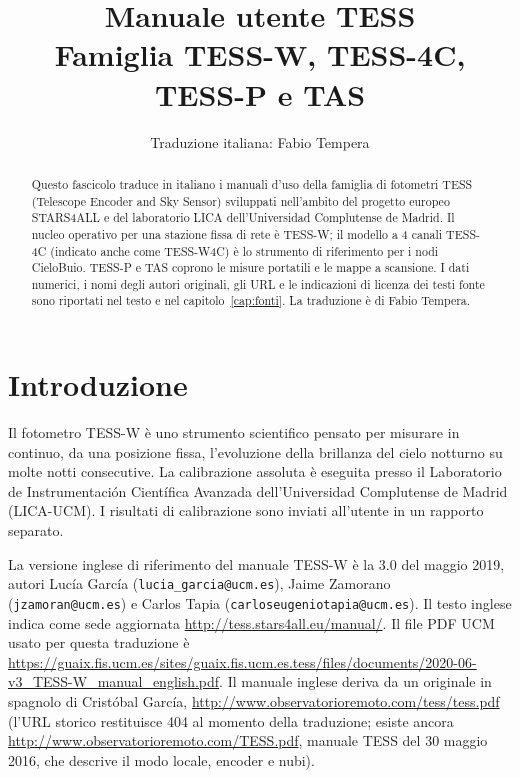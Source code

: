 \documentclass[11pt,a4paper]{report}
\title{Manuale utente TESS\\[0.6em]
\large Famiglia TESS-W, TESS-4C, TESS-P e TAS}
\author{Traduzione italiana: Fabio Tempera}
\date{}
\begin{document}
\maketitle

\begin{abstract}
Questo fascicolo traduce in italiano i manuali d'uso della famiglia di fotometri TESS (Telescope Encoder and Sky Sensor) sviluppati nell'ambito del progetto europeo STARS4ALL e del laboratorio LICA dell'Universidad Complutense de Madrid. Il nucleo operativo per una stazione fissa di rete è TESS-W; il modello a 4 canali TESS-4C (indicato anche come TESS-W4C) è lo strumento di riferimento per i nodi CieloBuio. TESS-P e TAS coprono le misure portatili e le mappe a scansione. I dati numerici, i nomi degli autori originali, gli URL e le indicazioni di licenza dei testi fonte sono riportati nel testo e nel capitolo~\ref{cap:fonti}. La traduzione è di Fabio Tempera.
\end{abstract}

\tableofcontents

\chapter{Introduzione}

Il fotometro TESS-W è uno strumento scientifico pensato per misurare in continuo, da una posizione fissa, l'evoluzione della brillanza del cielo notturno su molte notti consecutive. La calibrazione assoluta è eseguita presso il Laboratorio de Instrumentación Científica Avanzada dell'Universidad Complutense de Madrid (LICA-UCM). I risultati di calibrazione sono inviati all'utente in un rapporto separato.

La versione inglese di riferimento del manuale TESS-W è la 3.0 del maggio 2019, autori Lucía García (\texttt{lucia\_garcia@ucm.es}), Jaime Zamorano (\texttt{jzamoran@ucm.es}) e Carlos Tapia (\texttt{carloseugeniotapia@ucm.es}). Il testo inglese indica come sede aggiornata \url{http://tess.stars4all.eu/manual/}. Il file PDF UCM usato per questa traduzione è \url{https://guaix.fis.ucm.es/sites/guaix.fis.ucm.es.tess/files/documents/2020-06-v3_TESS-W_manual_english.pdf}. Il manuale inglese deriva da un originale in spagnolo di Cristóbal García, \url{http://www.observatorioremoto.com/tess/tess.pdf} (l'URL storico restituisce 404 al momento della traduzione; esiste ancora \url{http://www.observatorioremoto.com/TESS.pdf}, manuale TESS del 30 maggio 2016, che descrive il modo locale, encoder e nubi).
\end{document}
